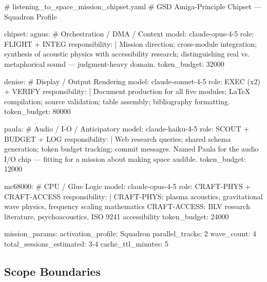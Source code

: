 \documentclass[11pt,letterpaper]{article}
\begin{document}
\begin{asciibox}
# listening_to_space_mission_chipset.yaml
# GSD Amiga-Principle Chipset — Squadron Profile

chipset:
  agnus:                            # Orchestration / DMA / Context
    model: claude-opus-4-5
    role: FLIGHT + INTEG
    responsibility: |
      Mission direction; cross-module integration;
      synthesis of acoustic physics with accessibility
      research; distinguishing real vs. metaphorical
      sound — judgment-heavy domain.
    token_budget: 32000

  denise:                           # Display / Output Rendering
    model: claude-sonnet-4-5
    role: EXEC (x2) + VERIFY
    responsibility: |
      Document production for all five modules;
      LaTeX compilation; source validation;
      table assembly; bibliography formatting.
    token_budget: 80000

  paula:                            # Audio / I-O / Anticipatory
    model: claude-haiku-4-5
    role: SCOUT + BUDGET + LOG
    responsibility: |
      Web research queries; shared schema generation;
      token budget tracking; commit messages.
      Named Paula for the audio I/O chip — fitting
      for a mission about making space audible.
    token_budget: 12000

  mc68000:                          # CPU / Glue Logic
    model: claude-opus-4-5
    role: CRAFT-PHYS + CRAFT-ACCESS
    responsibility: |
      CRAFT-PHYS: plasma acoustics, gravitational
        wave physics, frequency scaling mathematics
      CRAFT-ACCESS: BLV research literature,
        psychoacoustics, ISO 9241 accessibility
    token_budget: 24000

mission_params:
  activation_profile: Squadron
  parallel_tracks: 2
  wave_count: 4
  total_sessions_estimated: 3-4
  cache_ttl_minutes: 5
\end{asciibox}

\subsection{Scope Boundaries}
\end{document}
